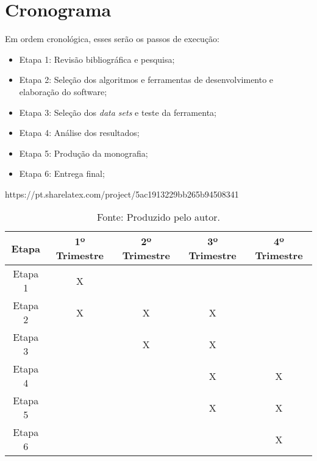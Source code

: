 \chapter{Cronograma}
\label{c.cronograma}

Em ordem cronológica, esses serão os passos de execução:
\begin{itemize}
    \item Etapa 1: Revisão bibliográfica e pesquisa;
    \item Etapa 2: Seleção dos algoritmos e ferramentas de desenvolvimento e elaboração do software;
    \item Etapa 3: Seleção dos \textit{data sets} e teste da ferramenta;
    \item Etapa 4: Análise dos resultados;
    \item Etapa 5: Produção da monografia;
    \item Etapa 6: Entrega final;
\end{itemize}
https://pt.sharelatex.com/project/5ac1913229bb265b94508341
\begin{table}[h]
    \centering
    \begin{tabular}{|c|c|c|c|c|}
    \hline
    \textbf{Etapa} & \textbf{1º Trimestre} & \textbf{2º Trimestre} & \textbf{3º Trimestre} & \textbf{4º Trimestre} \\\hline \hline
        {Etapa 1} & {\small X} & {} & {} & {}\\\hline
        {Etapa 2} & {\small X} & {\small X} & {\small X} & {}\\\hline
        {Etapa 3} & {} & {\small X} & {\small X} & {}\\\hline
        {Etapa 4} & {} & {} & {\small X} & {\small X}\\\hline
        {Etapa 5} & {} & {} & {\small X} & {\small X}\\\hline
        {Etapa 6} & {} & {} & {} & {\small X}\\\hline
    \end{tabular}
    \caption{Fonte: Produzido pelo autor.}
    \label{tab:my_label}
\end{table}
